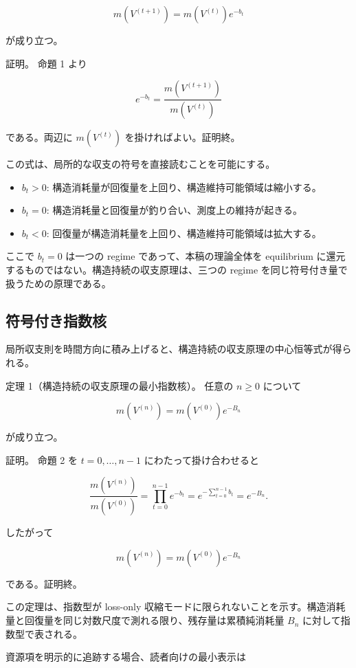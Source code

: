 \documentclass[12pt,a4paper]{article}
\begin{document}
\[
m(V^{(t+1)}) = m(V^{(t)}) e^{-b_{t}}
\]

が成り立つ。

証明。 命題 1 より

\[
e^{-b_{t}} = \frac{m(V^{(t+1)})}{m(V^{(t)})}
\]

である。両辺に \(m(V^{(t)})\) を掛ければよい。証明終。

この式は、局所的な収支の符号を直接読むことを可能にする。

\begin{itemize}
\tightlist
\item
  \(b_{t}>0\): 構造消耗量が回復量を上回り、構造維持可能領域は縮小する。
\item
  \(b_{t}=0\): 構造消耗量と回復量が釣り合い、測度上の維持が起きる。
\item
  \(b_{t}<0\): 回復量が構造消耗量を上回り、構造維持可能領域は拡大する。
\end{itemize}

ここで \(b_{t}=0\) は一つの regime であって、本稿の理論全体を equilibrium に還元するものではない。構造持続の収支原理は、三つの regime を同じ符号付き量で扱うための原理である。

\subsection{符号付き指数核}\label{ux7b26ux53f7ux4ed8ux304dux6307ux6570ux6838}

局所収支則を時間方向に積み上げると、構造持続の収支原理の中心恒等式が得られる。

定理 1（構造持続の収支原理の最小指数核）。 任意の \(n\ge 0\) について

\[
m(V^{(n)}) = m(V^{(0)}) e^{-B_{n}}
\]

が成り立つ。

証明。 命題 2 を \(t=0,\ldots,n-1\) にわたって掛け合わせると

\[
\frac{m(V^{(n)})}{m(V^{(0)})} = \prod_{t=0}^{n-1} e^{-b_{t}} = e^{-\sum_{t=0}^{n-1} b_{t}} = e^{-B_{n}}.
\]

したがって

\[
m(V^{(n)}) = m(V^{(0)}) e^{-B_{n}}
\]

である。証明終。

この定理は、指数型が loss-only 収縮モードに限られないことを示す。構造消耗量と回復量を同じ対数尺度で測れる限り、残存量は累積純消耗量 \(B_{n}\) に対して指数型で表される。

資源項を明示的に追跡する場合、読者向けの最小表示は
\end{document}
